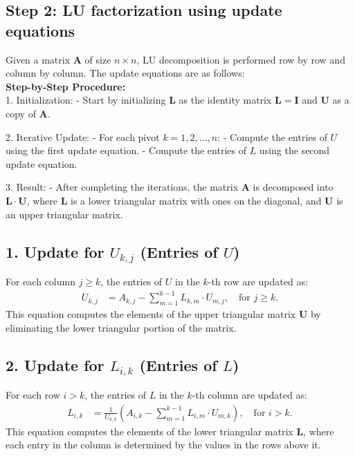 \documentclass[journal]{IEEEtran}
\begin{document}
\subsection*{Step 2: LU factorization using update equations}
Given a matrix $ \mathbf{A} $ of size $ n \times n $, LU decomposition is performed row by row and column by column. The update equations are as follows:\\
\textbf{Step-by-Step Procedure:}\\
1. Initialization: 
- Start by initializing $ \mathbf{L} $ as the identity matrix $ \mathbf{L} = \mathbf{I} $ and $ \mathbf{U} $ as a copy of $ \mathbf{A} $.
	
2. Iterative Update:
- For each pivot $ k = 1, 2, \ldots, n $:
- Compute the entries of $ U $ using the first update equation.
- Compute the entries of $ L $ using the second update equation.
	
3. Result:
- After completing the iterations, the matrix $ \mathbf{A} $ is decomposed into $ \mathbf{L} \cdot \mathbf{U} $, where $ \mathbf{L} $ is a lower triangular matrix with ones on the diagonal, and $ \mathbf{U} $ is an upper triangular matrix.
	
\subsection*{1. Update for $ U_{k,j} $ (Entries of $ U $)}

For each column $ j \geq k $, the entries of $ U $ in the $ k $-th row are updated as:
\begin{align}
U_{k,j} &= A_{k,j} - \sum_{m=1}^{k-1} L_{k,m} \cdot U_{m,j}, \quad \text{for } j \geq k.
\end{align}
This equation computes the elements of the upper triangular matrix $ \mathbf{U} $ by eliminating the lower triangular portion of the matrix.

\subsection*{2. Update for $ L_{i,k} $ (Entries of $ L $)}

For each row $ i > k $, the entries of $ L $ in the $ k $-th column are updated as:
\begin{align}
L_{i,k} &= \frac{1}{U_{k,k}} \left( A_{i,k} - \sum_{m=1}^{k-1} L_{i,m} \cdot U_{m,k} \right), \quad \text{for } i > k.
\end{align}
This equation computes the elements of the lower triangular matrix $ \mathbf{L} $, where each entry in the column is determined by the values in the rows above it.\\
\end{document}
